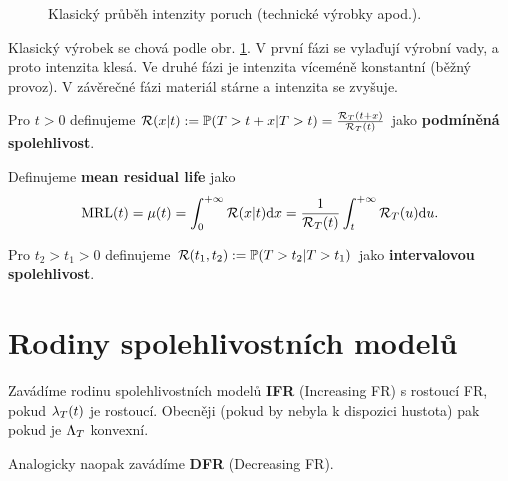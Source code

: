 \begin{figure}[h]
	\centering    
	\caption{Klasický průběh intenzity poruch (technické výrobky apod.).} \label{faze}
\end{figure}

Klasický výrobek se chová podle obr. \ref{faze}. V první fázi se vylaďují výrobní vady, a proto intenzita klesá. Ve druhé fázi je intenzita víceméně konstantní (běžný provoz). V závěrečné fázi materiál stárne a intenzita se zvyšuje.

\begin{define}
Pro $t>0$ definujeme $\mathcal{R}(x|t):=\mathbb{P}(T>t+x|T>t)=\frac{\mathcal{R}_T(t+x)}{\mathcal{R}_T(t)}$ jako \textbf{podmíněná spolehlivost}.	
\end{define}

\begin{define}
Definujeme \textbf{mean residual life} jako $$\mathrm{MRL}(t)=\mu(t)=\int_{0}^{+\infty}\mathcal{R}(x|t)\mathrm{d} x=\frac{1}{\mathcal{R}_T(t)}\int_{t}^{+\infty}\mathcal{R}_T(u)\mathrm{d} u.$$
\end{define}

\begin{define}
	Pro $t_2>t_1>0$ definujeme $\mathcal{R}(t_1,t_2):=\mathbb{P}(T>t_2|T>t_1)$ jako \textbf{intervalovou spolehlivost}.
\end{define}

\section{Rodiny spolehlivostních modelů}
\begin{define}
	Zavádíme rodinu spolehlivostních modelů \textbf{IFR} (Increasing FR) s rostoucí FR, pokud $\lambda_T(t)$ je rostoucí. Obecněji (pokud by nebyla k dispozici hustota) pak pokud je $\Lambda_T$ konvexní.
	
	Analogicky naopak zavádíme \textbf{DFR} (Decreasing FR).
\end{define}

